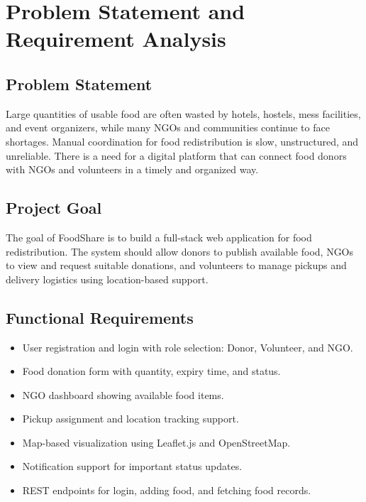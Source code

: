 \documentclass[12pt,a4paper]{report}
\newcommand{\projecttitle}{FoodShare}
\begin{document}
\chapter{Problem Statement and Requirement Analysis}

\section{Problem Statement}
Large quantities of usable food are often wasted by hotels, hostels, mess facilities, and event organizers, while many NGOs and communities continue to face shortages. Manual coordination for food redistribution is slow, unstructured, and unreliable. There is a need for a digital platform that can connect food donors with NGOs and volunteers in a timely and organized way.

\section{Project Goal}
The goal of \projecttitle{} is to build a full-stack web application for food redistribution. The system should allow donors to publish available food, NGOs to view and request suitable donations, and volunteers to manage pickups and delivery logistics using location-based support.

\section{Functional Requirements}
\begin{itemize}[leftmargin=1.2cm]
\item User registration and login with role selection: Donor, Volunteer, and NGO.
\item Food donation form with quantity, expiry time, and status.
\item NGO dashboard showing available food items.
\item Pickup assignment and location tracking support.
\item Map-based visualization using Leaflet.js and OpenStreetMap.
\item Notification support for important status updates.
\item REST endpoints for login, adding food, and fetching food records.
\end{itemize}
\end{document}
